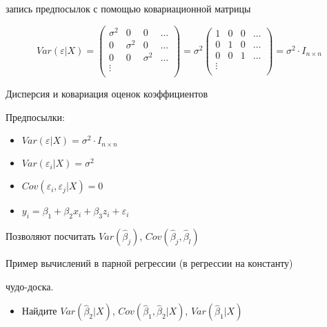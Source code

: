 \documentclass[ignorenonframetext,]{beamer}
\begin{document}
\begin{frame}{запись предпосылок с помощью ковариационной матрицы}

\[
Var(\varepsilon|X) = \begin{pmatrix}
\sigma^2 & 0 & 0 & \ldots \\
0 & \sigma^2 & 0 & \ldots \\
0 & 0 & \sigma^2 & \ldots \\
\vdots & & & \\
\end{pmatrix}
= \sigma^2 \begin{pmatrix}
1 & 0 & 0 & \ldots \\
0 & 1 & 0 & \ldots \\
0 & 0 & 1 & \ldots \\
\vdots & & & \\
\end{pmatrix}=\sigma^2 \cdot I_{n\times n}
\]

\end{frame}

\begin{frame}{Дисперсия и ковариация оценок коэффициентов}

Предпосылки:

\begin{itemize}
\itemsep1pt\parskip0pt
\item
  $Var(\varepsilon|X)=\sigma^2 \cdot I_{n\times n}$
\item
  $Var(\varepsilon_i|X)=\sigma^2$
\item
  $Cov(\varepsilon_i,\varepsilon_j|X)=0$
\item
  $y_i=\beta_1 + \beta_2 x_i + \beta_3 z_i +\varepsilon_i$
\end{itemize}

Позволяют посчитать $Var(\hat{\beta}_j)$,
$Cov(\hat{\beta}_j,\hat{\beta}_l)$

\end{frame}

\begin{frame}{Пример вычислений в парной регрессии (в регрессии на
константу)}

чудо-доска.

\begin{itemize}
\itemsep1pt\parskip0pt
\item
  Найдите $Var(\hat{\beta}_2|X)$, $Cov(\hat{\beta}_1,\hat{\beta}_2 |X)$,
  $Var(\hat{\beta}_1|X)$
\end{itemize}

\end{frame}
\end{document}
